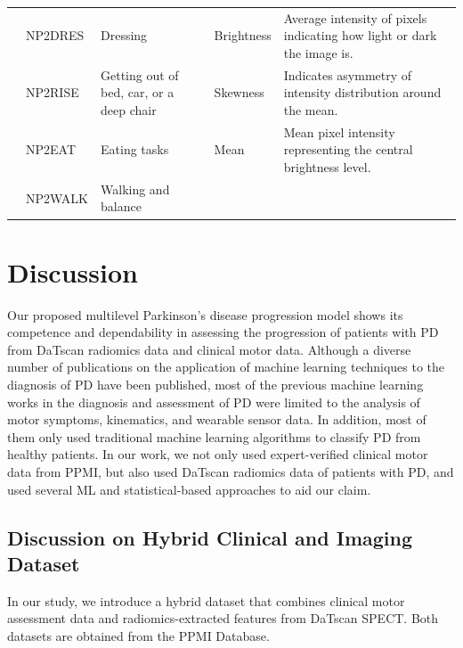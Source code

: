 \documentclass{article}
\begin{document}
\begin{table}[h]
\begin{tabular}{ll p{4.5cm}l p{5.7cm}}
        & NP2DRES  & Dressing                                 
        & Brightness        & Average intensity of pixels indicating how light or dark the image is. \\
        
        & NP2RISE  & Getting out of bed, car, or a deep chair   
        & Skewness          & Indicates asymmetry of intensity distribution around the mean. \\
        
        & NP2EAT   & Eating tasks                             
        & Mean              & Mean pixel intensity representing the central brightness level. \\
        
        & NP2WALK  & Walking and balance                      
        &                   & \\
    \hline
    \end{tabular}
\end{table}

\section{Discussion}
\label{Discussion}

Our proposed multilevel Parkinson's disease progression model shows its competence and dependability in assessing the progression of patients with PD from DaTscan radiomics data and clinical motor data. Although a diverse number of publications on the application of machine learning techniques to the diagnosis of PD have been published, most of the previous machine learning works in the diagnosis and assessment of PD were limited to the analysis of motor symptoms, kinematics, and wearable sensor data. In addition, most of them only used traditional machine learning algorithms to classify PD from healthy patients. In our work, we not only used expert-verified clinical motor data from PPMI, but also used DaTscan radiomics data of patients with PD, and used several ML and statistical-based approaches to aid our claim.

\subsection{Discussion on Hybrid Clinical and Imaging Dataset}
In our study, we introduce a hybrid dataset that combines clinical motor assessment data and radiomics-extracted features from DaTscan SPECT. Both datasets are obtained from the PPMI Database. 
\end{document}
